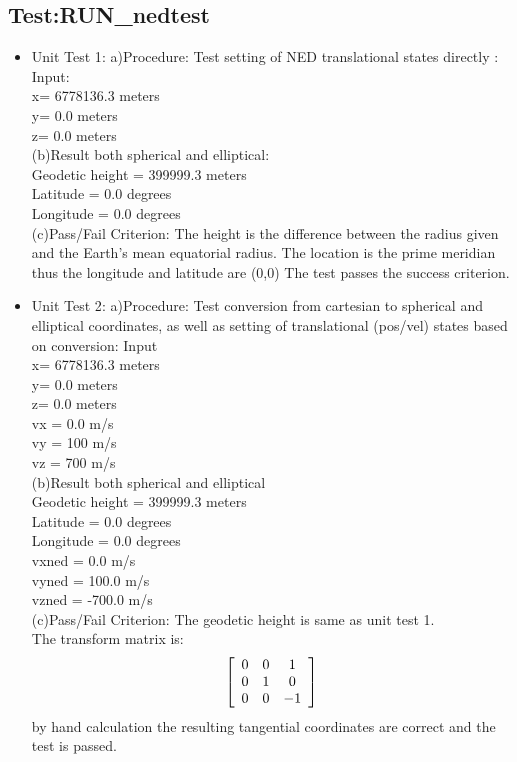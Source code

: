 \documentclass[twoside,11pt,titlepage]{report}
\begin{document}
\subsection{Test:RUN\_nedtest }\label{ned}
\begin{itemize}
\item{Unit Test 1}:\label{unit4}\newline
a)Procedure:\newline
Test setting of NED translational states directly :\newline
Input:\\
x= 6778136.3 meters \\
y= 0.0 meters\\
z= 0.0 meters \\
(b)Result both spherical and elliptical:\\
Geodetic height = 399999.3 meters \\
Latitude = 0.0 degrees \\
Longitude = 0.0 degrees \\
(c){Pass/Fail Criterion}:\newline
The height is the difference between the radius given and the Earth's mean equatorial radius.
The location is the prime meridian thus the longitude and latitude are (0,0)
The test passes the success criterion.

\item{Unit Test 2}:\label{unit5}\newline
a)Procedure:\newline
Test conversion from cartesian to spherical and elliptical coordinates, as
well as setting of translational (pos/vel) states based on conversion:\newline
Input\\
x= 6778136.3 meters \\
y= 0.0 meters\\
z= 0.0 meters \\
vx = 0.0 m/s \\
vy = 100 m/s \\
vz = 700 m/s \\
(b)Result both spherical and elliptical\\
Geodetic height = 399999.3 meters \\
Latitude = 0.0 degrees \\
Longitude = 0.0 degrees \\
vxned = 0.0 m/s \\
vyned = 100.0 m/s \\
vzned = -700.0 m/s \\
(c){Pass/Fail Criterion}:\newline
The geodetic height is same as unit test 1.\\
The transform matrix is:
\begin{equation}
\left[ {\begin{array}{*{20}c}
   0 & 0 & 1  \\
   0 & 1 & 0  \\
   0 & 0 & { - 1}  \\
\end{array}} \right]
\end{equation}
by hand calculation the resulting tangential coordinates are correct
and the test is passed.


\end{itemize}
\end{document}
